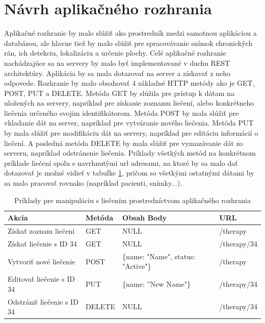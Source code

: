 \section{Návrh aplikačného rozhrania}
Aplikačné rozhranie by malo slúžiť ako prostredník medzi samotnou aplikáciou a databázou, ale hlavne tiež by malo slúžiť pre spracovávanie snímok chronických rán, ich detekciu, lokalizáciu a určenie plochy. Celé aplikačné rozhranie nachádzajúce sa na servery by malo byť implementované v duchu REST architektúry. Aplikácia by sa mala dotazovať na server a získavať z neho odpovede. Rozhranie by malo obsahovať 4 základné HTTP metódy ako je GET, POST, PUT a DELETE. Metóda GET by slúžila pre prístup k dátam na uložených na servery, napríklad pre získanie zoznamu liečení, alebo konkrétneho liečenia určeného svojim identifikátorom. Metóda POST by mala slúžiť pre vkladanie dát na server, napríklad pre vytváranie nového liečenia. Metóda PUT by mala slúžiť pre modifikáciu dát na servery, napríklad pre editáciu informácií o liečení. A posledná metóda DELETE by mala slúžiť pre vymazávanie dát zo serveru, napríklad odstránenie liečenia. Príklady všetkých metód na konkrétnom príklade liečení spolu s navrhnutými url adresami, na ktoré by sa malo dať dotazovať je možné vidieť v tabuľke \ref{tab:rest-example}, pričom so všetkými ostatnými dátami by sa malo pracovať rovnako (napríklad pacienti, snímky...).
\begin{table}[h]
\centering
\begin{tabular}{|l|l|l|l|}
\hline
Akcia                      & Metóda & Obsah Body                         & URL         \\ \hline
Získať zoznam liečení      & GET    & NULL                               & /therapy    \\ \hline
Získať liečenie s ID 34    & GET    & NULL                               & /therapy/34 \\ \hline
Vytvoriť nové liečenie     & POST   & \{name: "Name", status: "Active"\} & /therapy    \\ \hline
Editovať liečenie s ID 34  & PUT    & \{name: ''New Name"\}              & /therapy/34  \\ \hline
Odstrániť liečenie s ID 34 & DELETE & NULL                               & /therapy/34  \\ \hline
\end{tabular}
\caption{Príklady pre manipuláciu s liečením prostredníctvom aplikačného rozhrania}
\label{tab:rest-example}
\end{table}

